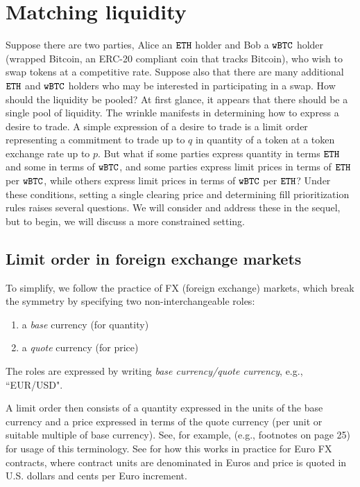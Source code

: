 \documentclass[11pt, reqno]{amsart}
\theoremstyle{definition}
\theoremstyle{remark}
\newcommand{\BTC}{\textnormal{\texttt{wBTC}}}
\newcommand{\ETH}{\textnormal{\texttt{ETH}}}
\begin{document}
\section{Matching liquidity}
Suppose there are two parties, Alice an $\ETH$ holder and Bob a $\BTC$ holder
(wrapped Bitcoin, an ERC-20 compliant coin that tracks Bitcoin), who wish to
swap tokens at a competitive rate. Suppose also that there are many
additional $\ETH$ and $\BTC$ holders who may be interested in participating in a
swap. How should the liquidity be pooled? At first glance, it appears that
there should be a single pool of liquidity. The wrinkle manifests in determining
how to express a desire to trade. A simple expression of a desire to trade is
a limit order representing a commitment to trade up to $q$ in quantity of
a token at a token exchange rate up to $p$. But what if some parties express
quantity in terms $\ETH$ and some in terms of $\BTC$, and some parties
express limit prices in terms of $\ETH$ per $\BTC$, while others express limit
prices in terms of $\BTC$ per $\ETH$? Under these conditions, setting a single
clearing price and determining fill prioritization rules raises several
questions. We will consider and address these in the sequel, but to begin, we
will discuss a more constrained setting.

\subsection{Limit order in foreign exchange markets}
To simplify, we follow the practice of FX (foreign exchange) markets,
which break the symmetry by specifying two non-interchangeable roles:
\begin{enumerate}
	\item a \emph{base} currency (for quantity)
	\item a \emph{quote} currency (for price)
\end{enumerate}
The roles are expressed by writing \emph{base currency/quote currency}, e.g.,
``EUR/USD".

A limit order then consists of a quantity expressed in the units of the base
currency and a price expressed in terms of the quote currency (per unit or
suitable multiple of base currency). See, for example, \cite{Cme23} (e.g.,
footnotes on page 25) for usage of this terminology. See \cite{CmeFx} for how
this works in practice for Euro FX contracts, where contract units are
denominated in Euros and price is quoted in U.S. dollars and cents per Euro
increment.
\end{document}
